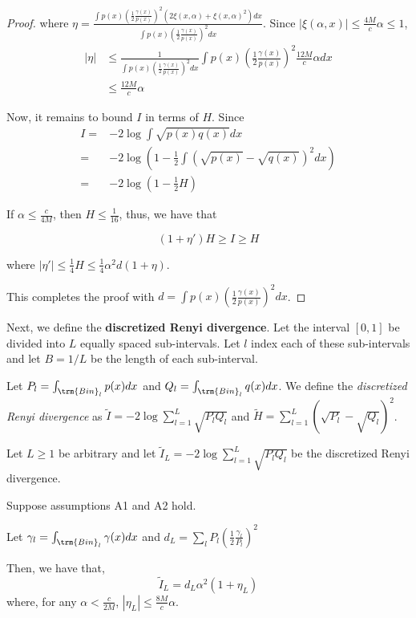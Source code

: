 \documentclass{article}
\begin{document}
\begin{proof}
where $\eta = \frac{ \int p(x) \left( \frac{1}{2} \frac{\gamma(x)}{p(x)} \right)^2 ( 2 \xi(x, \alpha) + \xi(x, \alpha)^2 )  dx }
             { \int p(x) \left( \frac{1}{2} \frac{\gamma(x)}{p(x)} \right)^2 dx}$. Since $| \xi(\alpha, x) | \leq \frac{4M}{c} \alpha \leq 1$, 
\begin{align*}
|\eta| & 
\leq \frac{1}{ \int p(x) \left( \frac{1}{2} \frac{\gamma(x)}{p(x)} \right)^2 dx } 
  \int p(x) \left( \frac{1}{2} \frac{\gamma(x)}{p(x)} \right)^2 \frac{12 M}{c} \alpha dx \\
&\leq \frac{12 M}{c} \alpha
\end{align*} 

Now, it remains to bound $I$ in terms of $H$. Since
\begin{align*}
I =& -2 \log \int \sqrt{p(x)q(x)} dx \\
 =& -2 \log \left( 1 - \frac{1}{2} \int (\sqrt{p(x)} - \sqrt{q(x)})^2 dx \right) \\
 =& -2 \log (1 - \frac{1}{2} H) 
\end{align*}

If $\alpha \leq \frac{c}{4M}$, then $H \leq \frac{1}{16}$, thus, we have that

\[
(1 + \eta') H \geq I \geq H
\]

where $|\eta'| \leq \frac{1}{4} H \leq \frac{1}{4} \alpha^2 d (1 + \eta)$.  

This completes the proof with $d = \int p(x) \left( \frac{1}{2} \frac{\gamma(x)}{p(x)} \right)^2 dx$. 

\end{proof}


Next, we define the \textbf{discretized Renyi divergence}. Let the interval $[0,1]$ be divided into $L$ equally spaced sub-intervals. Let $l$ index each of these sub-intervals and let $B = 1/L$ be the length of each sub-interval.

Let $P_l = \int_{\trm{Bin}_l} p(x) dx$ and $Q_l = \int_{\trm{Bin}_l} q(x)dx$. We define the \emph{discretized Renyi divergence} as $\tilde{I} = -2 \log \sum_{l=1}^L \sqrt{P_l Q_l} $ and $\tilde{H} = \sum_{l=1}^L (\sqrt{P_l} - \sqrt{Q_l})^2$. 


\begin{proposition}
\label{prop:discrete_renyi_order}
Let $L \geq 1$ be arbitrary and let $\tilde{I}_L = -2 \log \sum_{l=1}^L \sqrt{P_l Q_l}$ be the discretized Renyi divergence. 

Suppose assumptions A1 and A2 hold. 

Let $\gamma_l = \int_{\trm{Bin}_l} \gamma(x) dx$ and $d_L = \sum_l P_l \left( \frac{1}{2} \frac{\gamma_l}{P_l} \right)^2 $

Then, we have that,
\[
 \tilde{I}_L = d_L \alpha^2 ( 1 + \eta_L )
\]
where, for any $\alpha < \frac{c}{2M}$, $|\eta_L| \leq \frac{8M}{c} \alpha$.

\end{proposition}
\end{document}
